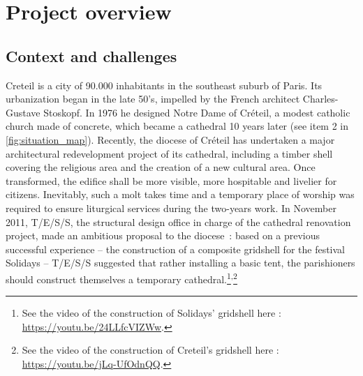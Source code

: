 \section{Project overview}
\subsection{Context and challenges}
Creteil is a city of 90.000 inhabitants in the southeast suburb of Paris. Its urbanization began in the late 50’s, impelled by the French architect Charles-Gustave Stoskopf. In 1976 he designed Notre Dame of Créteil, a modest catholic church made of concrete, which became a cathedral 10 years later (see item 2 in \cref{fig:situation_map}). Recently, the diocese of Créteil has undertaken a major architectural redevelopment project of its cathedral, including a timber shell covering the religious area and the creation of a new cultural area. Once transformed, the edifice shall be more visible, more hospitable and livelier for citizens. Inevitably, such a molt takes time and a temporary place of worship was required to ensure liturgical services during the two-years work. In November 2011, T/E/S/S, the structural design office in charge of the cathedral renovation project, made an ambitious proposal to the diocese~: based on a previous successful experience – the construction of a composite gridshell for the festival Solidays \cite{Baverel2012} – T/E/S/S suggested that rather installing a basic tent, the parishioners should construct themselves a temporary cathedral.\footnote{See the video of the construction of Solidays' gridshell here : \url{https://youtu.be/24LLfcVIZWw}.}\textsuperscript{,}\footnote{See the video of the construction of Creteil's gridshell here : \url{https://youtu.be/jLq-UfOdnQQ}.}

